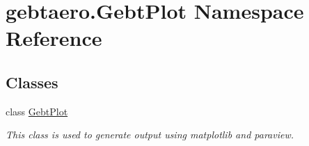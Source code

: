 \hypertarget{namespacegebtaero_1_1_gebt_plot}{}\section{gebtaero.\+Gebt\+Plot Namespace Reference}
\label{namespacegebtaero_1_1_gebt_plot}
\subsection*{Classes}
\begin{DoxyCompactItemize}
\item 
class \hyperlink{classgebtaero_1_1_gebt_plot_1_1_gebt_plot}{Gebt\+Plot}
\begin{DoxyCompactList}\small\item\em This class is used to generate output using matplotlib and paraview. \end{DoxyCompactList}\end{DoxyCompactItemize}
